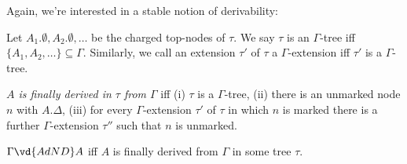 Again, we're interested in a stable notion of derivability:

Let $A_1.\emptyset, A_2.\emptyset,\ldots$ be the charged
top-nodes of $\tau$. We say $\tau$ is an $\Gamma$-tree iff
$\{A_1, A_2,\ldots\} \subseteq \Gamma$. Similarly, we call an
extension $\tau'$ of $\tau$ a $\Gamma$-extension iff $\tau'$
is a $\Gamma$-tree.

\begin{defn}
  \emph{$A$ is finally derived in $\tau$ from $\Gamma$} iff
  (i) $\tau$ is a $\Gamma$-tree, (ii) there is an unmarked
  node $n$ with $A.\Delta$, (iii) for every
  $\Gamma$-extension $\tau'$ of $\tau$ in which $n$ is marked
  there is a further $\Gamma$-extension $\tau''$ such that
  $n$ is unmarked.
\end{defn}

\begin{defn}
  $\Gamma \vd{AdND} A$ iff $A$ is finally derived from
  $\Gamma$ in some tree $\tau$.
\end{defn}


